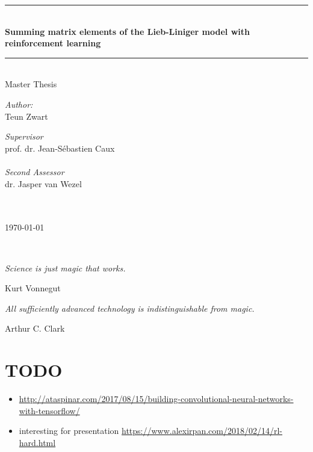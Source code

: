 \documentclass[11pt, a4paper]{report} %
\newcommand\TITLE{Summing matrix elements of the Lieb-Liniger model with reinforcement learning\\}
\newcommand\THESISFORM{Master Thesis}
\newcommand\AUTHOR{Teun Zwart}
\newcommand\SUPERVISOR{prof. dr. Jean-Sébastien Caux}
\newcommand\SECONDASSESSOR{dr. Jasper van Wezel}
\newcommand\UNIVERSITYLOGO{} %
\begin{document}
\begin{titlepage}
	\begin{center}
		\rule{\textwidth}{0.4mm}\\[0.5cm]
		\huge{\textbf{\TITLE}}
		\rule{\textwidth}{0.4mm}\\[0.5cm]
		\Large{\THESISFORM}\\[0.5cm]
		\begin{minipage}[t]{0.4\textwidth}
			\begin{flushleft}
				\large\emph{Author:}\\{\AUTHOR}
			\end{flushleft}
		\end{minipage}
		\begin{minipage}[t]{0.4\textwidth}
			\begin{flushright}
				\large\emph{Supervisor}\\{\SUPERVISOR}\\~\\
				\large\emph{Second Assessor}\\{\SECONDASSESSOR}\\~\\~\\
			\end{flushright}
		\end{minipage}
		\vfill
		\large \today\\
	\end{center}
\end{titlepage}

\newpage
\thispagestyle{empty}

\ 
\vspace{4cm}

\epigraph{\textit{Science is just magic that works.}}{Kurt Vonnegut}

\epigraph{\textit{All sufficiently advanced technology is indistinguishable from magic.}}{Arthur C. Clark}


\tableofcontents

\section*{TODO}
\begin{itemize}
  \item \url{http://ataspinar.com/2017/08/15/building-convolutional-neural-networks-with-tensorflow/}
  \item interesting for presentation \url{https://www.alexirpan.com/2018/02/14/rl-hard.html}
\end{itemize}
\end{document}
